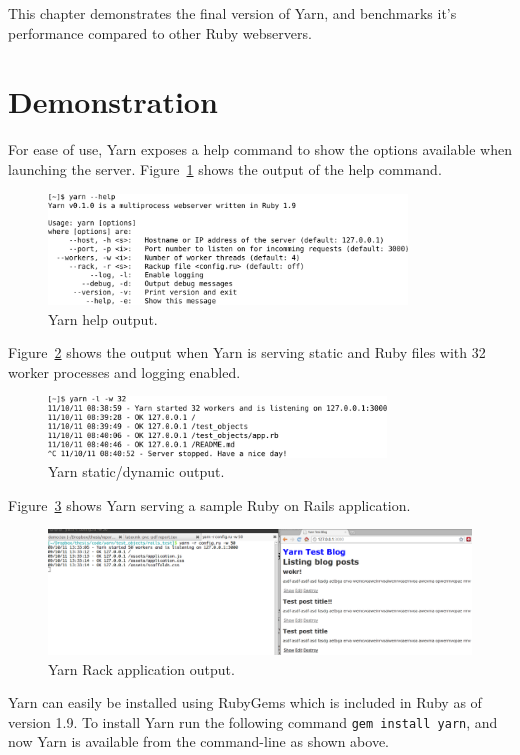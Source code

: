 This chapter demonstrates the final version of Yarn, and benchmarks it's
performance compared to other Ruby webservers.

\section{Demonstration}
For ease of use, Yarn exposes a help command to show the options available
when launching the server. Figure~\ref{screenshot} shows the output of the
help command.

\begin{figure}[htb]
  \centering
  \includegraphics[width=0.85\textwidth]{img/yarnhelp.pdf}
  \caption{Yarn help output.}
  \label{screenshot}
\end{figure}

Figure~\ref{screenshot2} shows the output when Yarn is serving static and Ruby
files with 32 worker processes and logging enabled.

\begin{figure}[htb]
  \centering
  \includegraphics[width=0.8\textwidth]{img/yarnserve.pdf}
  \caption{Yarn static/dynamic output.}
  \label{screenshot2}
\end{figure}

Figure~\ref{screenshot3} shows Yarn serving a sample Ruby on Rails
application.

\begin{figure}[htb]
  \centering
  \includegraphics[width=1.0\textwidth]{img/scr3.png}
  \caption{Yarn Rack application output.}
  \label{screenshot3}
\end{figure}

Yarn can easily be installed using RubyGems which is included in Ruby as of
version 1.9. To install Yarn run the following command \texttt{gem install
yarn}, and now Yarn is available from the command-line as shown above. 

